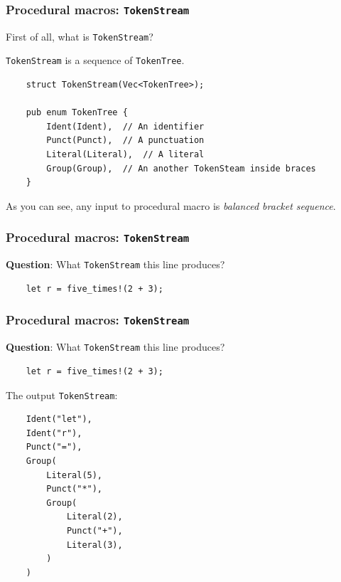 \documentclass[aspectratio=1610,t]{beamer}
\begin{document}

\begin{frame}[fragile]
\frametitle{Procedural macros: \texttt{TokenStream}}
First of all, what is \texttt{TokenStream}?

\texttt{TokenStream} is a sequence of \texttt{TokenTree}.

\begin{verbatim}
    struct TokenStream(Vec<TokenTree>);

    pub enum TokenTree {
        Ident(Ident),  // An identifier
        Punct(Punct),  // A punctuation
        Literal(Literal),  // A literal
        Group(Group),  // An another TokenSteam inside braces
    }
\end{verbatim}

As you can see, any input to procedural macro is \textit{balanced bracket sequence}.
\end{frame}


\begin{frame}[fragile]
\frametitle{Procedural macros: \texttt{TokenStream}}
\textbf{Question}: What \texttt{TokenStream} this line produces?

\begin{verbatim}
    let r = five_times!(2 + 3);
\end{verbatim}
\end{frame}


\begin{frame}[fragile]
\frametitle{Procedural macros: \texttt{TokenStream}}
\textbf{Question}: What \texttt{TokenStream} this line produces?

\begin{verbatim}
    let r = five_times!(2 + 3);
\end{verbatim}

The output \texttt{TokenStream}:

\begin{verbatim}
    Ident("let"),
    Ident("r"),
    Punct("="),
    Group(
        Literal(5),
        Punct("*"),
        Group(
            Literal(2),
            Punct("+"),
            Literal(3),
        )
    )
\end{verbatim}
\end{frame}
\end{document}
